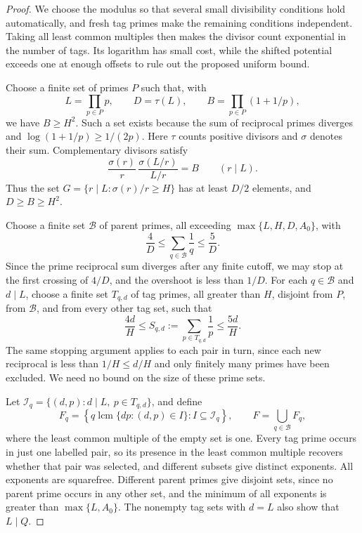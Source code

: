 \begin{proof}
We choose the modulus so that several small divisibility conditions hold
automatically, and fresh tag primes make the remaining conditions independent.
Taking all least common multiples then makes the divisor count
exponential in the number of tags. Its logarithm has small cost, while the
shifted potential exceeds one at enough offsets to rule out
the proposed uniform bound.

Choose a finite set of primes $P$ such that, with
\[
 L=\prod_{p\in P}p,\qquad D=\tau(L),\qquad
 B=\prod_{p\in P}(1+1/p),
\]
we have $B\ge H^2$.  Such a set exists because the sum of reciprocal primes
diverges and $\log(1+1/p)\ge1/(2p)$.
Here $\tau$ counts positive divisors and $\sigma$ denotes their sum.
Complementary divisors satisfy
\[
 \frac{\sigma(r)}r\,
 \frac{\sigma(L/r)}{L/r}=B\qquad(r\mid L).
\]
Thus the set
$G=\{r\mid L:\sigma(r)/r\ge H\}$ has at least $D/2$ elements,
and $D\ge B\ge H^2$.

Choose a finite set $\mathcal B$ of parent primes, all exceeding
$\max\{L,H,D,A_0\}$, with
\[
 \frac4D\le\sum_{q\in\mathcal B}\frac1q\le\frac5D.
\]
Since the prime reciprocal sum diverges after any finite cutoff, we may
stop at the first crossing of $4/D$, and the overshoot is less than $1/D$.
For each $q\in\mathcal B$ and $d\mid L$, choose a finite set $T_{q,d}$
of tag primes, all greater than $H$, disjoint from $P$, from $\mathcal B$,
and from every other tag set, such that
\[
 \frac{4d}{H}\le S_{q,d}:=\sum_{p\in T_{q,d}}\frac1p\le\frac{5d}{H}.
\]
The same stopping argument applies to each pair in turn, since each new reciprocal is
less than $1/H\le d/H$ and only finitely many primes have been excluded.
We need no bound on the size of these prime sets.

Let $\mathcal I_q=\{(d,p):d\mid L,\ p\in T_{q,d}\}$, and define
\[
 F_q=\left\{q\operatorname{lcm}\{dp:(d,p)\in I\}:
                         I\subseteq\mathcal I_q\right\},
 \qquad F=\bigcup_{q\in\mathcal B}F_q,
\]
where the least common multiple of the empty set is one.
Every tag prime occurs in just one labelled pair, so its presence in the
least common multiple recovers whether that pair was selected, and
different subsets give distinct exponents.  All exponents are
squarefree.  Different parent primes give disjoint sets, since no parent
prime occurs in any other set, and the minimum of all exponents is greater than
$\max\{L,A_0\}$.  The nonempty tag sets with $d=L$ also show that $L\mid Q$.


\end{proof}
